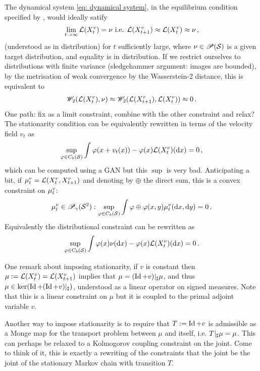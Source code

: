 \documentclass[twoside,10pt]{../jmlr}
\begin{document}
The dynamical system \eqref{eq: dynamical system}, in the equilibrium condition specified by \cite{deng2026generative}, would ideally satify 
\begin{align}
    \lim_{t\to\infty} \mathcal{L}(X_t^v)=\nu \mbox{ i.e. } \mathcal{L}(X_{t+1}^v)\approx\mathcal{L}(X_t^v)\approx\nu\,,
\end{align}
(understood as in distribution) for $t$ sufficiently large, where $\nu\in\mathscr{P}(\mathcal{S})$ is a given target distribution, and equality is in distribution. If we restrict ourselves to distributions with finite variance (sledgehammer argument: images are bounded), by the metrisation of weak convergence by the Wasserstein-2 distance, this is equivalent to
\begin{align}
\mathscr{W}_2(\mathcal{L}(X_t^v),\nu)\approx\mathscr{W}_2(\mathcal{L}(X_{t+1}^v),\mathcal{L}(X_t^v))\approx0\,.
\end{align}
One path: fix as a limit constraint, combine with the other constraint and relax? 
The stationarity condition can be equivalently rewritten in terms of the velocity field $v_t$ as 
\begin{align}
    \sup_{\varphi\in C_b(\mathcal{S})}\int\varphi(x+v_t(x))- \varphi(x)\mathcal{L}(X_t^v)(\mathrm{d} x)=0\,,
\end{align}
which can be computed using a GAN but this $\sup$ is very bad. Anticipating a bit, if $\mu^v_t=\mathcal{L}(X_t^v,X_{t+1}^v)$ and denoting by $\oplus$ the direct sum, this is a convex constraint on $\mu^v_t$:
\begin{align}
    \mu^v_t\in\mathscr{P}_\gamma(\mathcal{S}^2): \sup_{\varphi\in C_b(\mathcal{S})}\int\varphi\oplus\varphi(x,y)\mu^v_t(\mathrm{d} x,\mathrm{d} y)=0\,.
\end{align}
Equivalently the distributional constraint can be rewritten as
\begin{align}
    \sup_{\varphi\in C_b(\mathcal{S})}\int\varphi(x)\nu(\mathrm{d} x)- \varphi(x)\mathcal{L}(X_t^v)(\mathrm{d} x)=0\,.
\end{align}

One remark about imposing stationarity, if $v$ is constant then $\mu:=\mathcal{L}(X_t^v)= \mathcal{L}(X_{t+1}^v)$ implies that $\mu=(\operatorname{Id}+v) \vert_\sharp \mu$, and thus $\mu\in \ker(\operatorname{Id} + (\operatorname{Id}+v)\vert_\sharp)$, understood as a linear operator on signed measures. Note that this is a linear constraint on $\mu$ but it is coupled to the primal adjoint variable $v$.

Another way to impose stationarity is to require that $T:=\operatorname{Id}+v$ is admissible as a Monge map for the transport problem between $\mu$ and itself, i.e. $T\vert_\sharp \mu = \mu$. This can perhaps be relaxed to a Kolmogorov coupling constraint on the joint. Come to think of it, this is exactly a rewriting of the constraints that the joint be the joint of the stationary Markov chain with transition $T$. 
\end{document}
